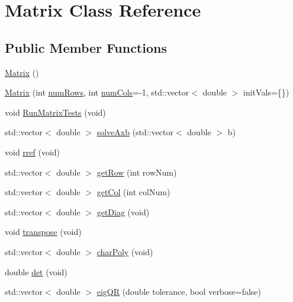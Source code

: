 \hypertarget{class_matrix}{}\section{Matrix Class Reference}
\label{class_matrix}
\subsection*{Public Member Functions}
\begin{DoxyCompactItemize}
\item 
\mbox{\hyperlink{class_matrix_a2dba13c45127354c9f75ef576f49269b}{Matrix}} ()
\item 
\mbox{\hyperlink{class_matrix_a4b4b9ae88079c441a7acc781fdbaa032}{Matrix}} (int \mbox{\hyperlink{class_matrix_a0eb658c64c749da9cc9705dc232fcb85}{num\+Rows}}, int \mbox{\hyperlink{class_matrix_a1ddb385f8482c80f98e5cdbf914ba11a}{num\+Cols}}=-\/1, std\+::vector$<$ double $>$ init\+Vals=\{\})
\item 
void \mbox{\hyperlink{class_matrix_a90d3e687ed2b75462f74b737d891f7ca}{Run\+Matrix\+Tests}} (void)
\item 
std\+::vector$<$ double $>$ \mbox{\hyperlink{class_matrix_ae340b61a6f3848f700ba34cd3992d2ab}{solve\+Axb}} (std\+::vector$<$ double $>$ b)
\item 
void \mbox{\hyperlink{class_matrix_a5510abd211511ab980d69b160d742f78}{rref}} (void)
\item 
std\+::vector$<$ double $>$ \mbox{\hyperlink{class_matrix_a81f93e482ceaca5d013ab34b64ee3eb4}{get\+Row}} (int row\+Num)
\item 
std\+::vector$<$ double $>$ \mbox{\hyperlink{class_matrix_a01b08c4fed1a9f7e80467e613cfc8c9e}{get\+Col}} (int col\+Num)
\item 
std\+::vector$<$ double $>$ \mbox{\hyperlink{class_matrix_adc0504b22f3d95218b5e754890f0db3e}{get\+Diag}} (void)
\item 
void \mbox{\hyperlink{class_matrix_ac9afd875262d35e1bab18604e3bc121c}{transpose}} (void)
\item 
std\+::vector$<$ double $>$ \mbox{\hyperlink{class_matrix_ac702d7055ec8bd0d804af3025b51cdec}{char\+Poly}} (void)
\item 
double \mbox{\hyperlink{class_matrix_a8229fbecb4ec1119be6c210186ecb95c}{det}} (void)
\item 
std\+::vector$<$ double $>$ \mbox{\hyperlink{class_matrix_adcb3d7e342e79b4d667860ffbf9811a1}{eig\+QR}} (double tolerance, bool verbose=false)
\item 

\end{DoxyCompactItemize}
